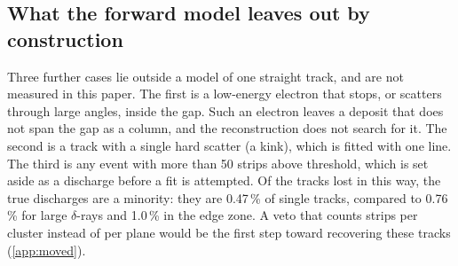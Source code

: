 \subsection{What the forward model leaves out by construction}
Three further cases lie outside a model of one straight track, and are not measured in this paper. The first is a
low-energy electron that stops, or scatters through large angles, inside the gap. Such an electron leaves a deposit
that does not span the gap as a column, and the reconstruction does not search for it. The second is a track with a
single hard scatter (a kink), which is fitted with one line. The third is any event with more than 50 strips above
threshold, which is set aside as a discharge before a fit is attempted. Of the tracks lost in this way, the true
discharges are a minority: they are 0.47\,\% of single tracks, compared to 0.76\,\% for large $\delta$-rays and
1.0\,\% in the edge zone. A veto that counts strips per cluster instead of per plane would be the first step toward
recovering these tracks (\cref{app:moved}).
